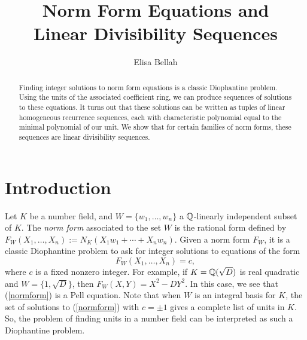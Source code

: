 \documentclass[11pt]{amsart}
\title[Norm Form Equations and Linear Divisibility Sequences]{Norm Form Equations and \\ Linear Divisibility Sequences}
\author{Elisa Bellah}
\begin{document}
\begin{abstract}
Finding integer solutions to norm form equations is a classic Diophantine problem. Using the units of the associated coefficient ring, we can produce sequences of solutions to these equations. It turns out that these solutions can be written as tuples of linear homogeneous recurrence sequences, each with characteristic polynomial equal to the minimal polynomial of our unit. We show that for certain families of norm forms, these sequences are linear divisibility sequences. 
\end{abstract}



\maketitle

\section{Introduction}
Let $K$ be a number field, and $W=\{w_1, \dots, w_n\}$ a $\mathbb{Q}$-linearly independent subset of $K$. The \textit{norm form} associated to the set $W$ is the rational form defined by $F_W(X_1, \dots, X_n):=N_K(X_1w_1+\cdots+X_nw_n).$  Given a norm form $F_W$, it is a classic Diophantine problem to ask for integer solutions to equations of the form
\begin{equation}\label{normform}
F_W(X_1, \dots, X_n)=c,
\end{equation}
where $c$ is a fixed nonzero integer. For example, if $K=\mathbb{Q}(\sqrt{D})$ is real quadratic and $W=\{1, \sqrt{D}\}$, then $F_W(X, Y)=X^2-DY^2$. In this case, we see that (\ref{normform}) is a Pell equation. Note that when $W$ is an integral basis for $K$, the set of solutions to (\ref{normform}) with $c =\pm 1$ gives a complete list of units in $K$. So, the problem of finding units in a number field can be interpreted as such a Diophantine problem.\\
\end{document}
